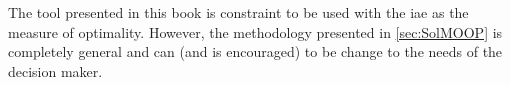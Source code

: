 The tool presented in this book is constraint to be used with the \gls{iae} as the measure of optimality. However, the methodology presented in \ref{sec:SolMOOP} is completely general and can (and is encouraged) to be change to the needs of the decision maker.


